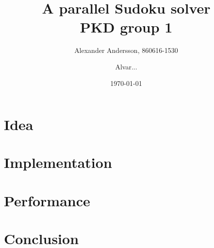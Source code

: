 \documentclass[12pt, a4paper]{article}
\title{A parallel Sudoku solver\\\small{PKD group 1}}
\author{Alexander Andersson, 860616-1530 \and Alvar...}
\date{\today}
\begin{document}
\maketitle

\begin{abstract}


\end{abstract}

\tableofcontents

\section{Idea}

\section{Implementation}

\section{Performance}

\section{Conclusion}
\end{document}
